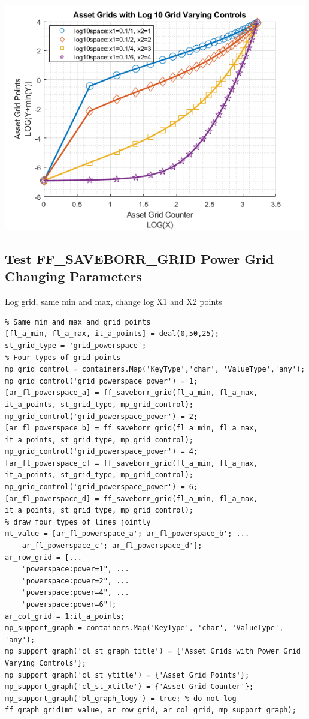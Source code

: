 \documentclass[
]{book}
\begin{document}
\includegraphics[width=5.20833in,height=\textheight]{img/fx_saveborr_grid_images/figure_3.png}

\hypertarget{test-ff_saveborr_grid-power-grid-changing-parameters}{%
\subsection{Test FF\_SAVEBORR\_GRID Power Grid Changing Parameters}\label{test-ff_saveborr_grid-power-grid-changing-parameters}}

Log grid, same min and max, change log X1 and X2 points

\begin{verbatim}
% Same min and max and grid points
[fl_a_min, fl_a_max, it_a_points] = deal(0,50,25);
st_grid_type = 'grid_powerspace';
% Four types of grid points
mp_grid_control = containers.Map('KeyType','char', 'ValueType','any');
mp_grid_control('grid_powerspace_power') = 1;
[ar_fl_powerspace_a] = ff_saveborr_grid(fl_a_min, fl_a_max, it_a_points, st_grid_type, mp_grid_control);
mp_grid_control('grid_powerspace_power') = 2;
[ar_fl_powerspace_b] = ff_saveborr_grid(fl_a_min, fl_a_max, it_a_points, st_grid_type, mp_grid_control);
mp_grid_control('grid_powerspace_power') = 4;
[ar_fl_powerspace_c] = ff_saveborr_grid(fl_a_min, fl_a_max, it_a_points, st_grid_type, mp_grid_control);
mp_grid_control('grid_powerspace_power') = 6;
[ar_fl_powerspace_d] = ff_saveborr_grid(fl_a_min, fl_a_max, it_a_points, st_grid_type, mp_grid_control);
% draw four types of lines jointly
mt_value = [ar_fl_powerspace_a'; ar_fl_powerspace_b'; ...
    ar_fl_powerspace_c'; ar_fl_powerspace_d'];
ar_row_grid = [...
    "powerspace:power=1", ...
    "powerspace:power=2", ...
    "powerspace:power=4", ...
    "powerspace:power=6"];
ar_col_grid = 1:it_a_points;
mp_support_graph = containers.Map('KeyType', 'char', 'ValueType', 'any');
mp_support_graph('cl_st_graph_title') = {'Asset Grids with Power Grid Varying Controls'};
mp_support_graph('cl_st_ytitle') = {'Asset Grid Points'};
mp_support_graph('cl_st_xtitle') = {'Asset Grid Counter'};
mp_support_graph('bl_graph_logy') = true; % do not log
ff_graph_grid(mt_value, ar_row_grid, ar_col_grid, mp_support_graph);
\end{verbatim}
\end{document}

